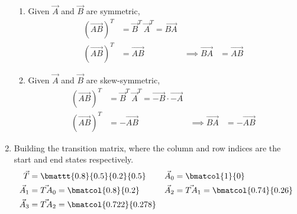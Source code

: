 \begin{enumerate}
\begin{enumerate}
              \item Given $ \vec{A} $ and $ \vec{B} $ are symmetric,
                    \begin{align}
                        (\vec{AB})^T      & = \vec{B}^T\ \vec{A}^T = \vec{BA}   \\
                        (\vec{AB})^T      & = \vec{AB}                        &
                        \implies \vec{BA} & = \vec{AB}
                    \end{align}
              \item Given $ \vec{A} $ and $ \vec{B} $ are skew-symmetric,
                    \begin{align}
                        (\vec{AB})^T      & = \vec{B}^T\ \vec{A}^T
                        = \vec{-B} \cdot \vec{-A}                    \\
                        (\vec{AB})^T      & = -\vec{AB}            &
                        \implies \vec{BA} & = -\vec{AB}
                    \end{align}
          \end{enumerate}

    \item Building the transition matrix, where the column and row indices are the
          start and end states respectively.
          \begin{align}
              \vec{T}   & = \bmattt{0.8}{0.5}{0.2}{0.5}         &
              \vec{A}_0 & = \bmatcol{1}{0}                        \\
              \vec{A}_1 & = \vec{TA}_0 = \bmatcol{0.8}{0.2}     &
              \vec{A}_2 & = \vec{TA}_1 = \bmatcol{0.74}{0.26}     \\
              \vec{A}_3 & = \vec{TA}_2 = \bmatcol{0.722}{0.278} &
          \end{align}


\end{enumerate}
